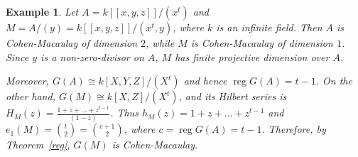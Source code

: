 \documentclass[11pt]{amsart}
\theoremstyle{plain}
\newtheorem{example}[theorem]{Example}
\theoremstyle{plain}
\begin{document}
\begin{example}\label{ex1}
\normalfont
Let $A=k[[x,y,z]]/(x^t)$ and $M=A/(y)=k[[x,y,z]]/(x^t,y)$, where $k$ is an infinite field. Then $A$ is Cohen-Macaulay of dimension $2$, while $M$ is Cohen-Macaulay of dimension $1$. Since $y$ is a non-zero-divisor on $A$, $M$ has finite projective dimension over $A$.

Moreover, $G(A)\cong k[X,Y,Z]/(X^t)$ and hence $\operatorname{reg} G(A)=t-1$. On the other hand,
$G(M)\cong k[X,Z]/(X^t)$, and its Hilbert series is
$\displaystyle H_{M}(z)=\frac{1+z+\ldots +z^{t-1}}{(1-z)}$. Thus $h_M(z)=1+z+\ldots +z^{t-1}$ and
$e_1(M)=\binom{t}{2}=\binom{c+1}{2}$, where $c=\operatorname{reg} G(A)=t-1$. Therefore, by Theorem~\ref{reg}, $G(M)$ is Cohen-Macaulay.
\end{example}
\end{document}
